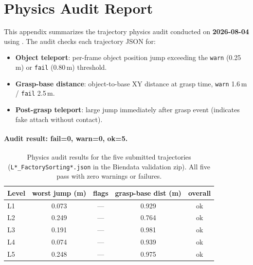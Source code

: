 \appendix
\section{Physics Audit Report}
\label{app:physics_audit}

This appendix summarizes the trajectory physics audit conducted on
\textbf{2026-08-04} using .
The audit checks each trajectory JSON for:
\begin{itemize}[leftmargin=*,itemsep=2pt]
    \item \textbf{Object teleport}: per-frame object position jump exceeding
    the \texttt{warn} (0.25\,m) or \texttt{fail} (0.80\,m) threshold.
    \item \textbf{Grasp-base distance}: object-to-base XY distance at grasp
    time, \texttt{warn} 1.6\,m / \texttt{fail} 2.5\,m.
    \item \textbf{Post-grasp teleport}: large jump immediately after grasp
    event (indicates fake attach without contact).
\end{itemize}

\paragraph{Audit result: fail=0, warn=0, ok=5.}

\begin{table}[h]
\centering
\small
\begin{tabular}{@{}lcccc@{}}
\toprule
Level & worst jump (m) & flags & grasp-base dist (m) & overall \\
\midrule
L1 & 0.073 & --- & 0.929 & ok \\
L2 & 0.249 & --- & 0.764 & ok \\
L3 & 0.191 & --- & 0.981 & ok \\
L4 & 0.074 & --- & 0.939 & ok \\
L5 & 0.248 & --- & 0.975 & ok \\
\bottomrule
\end{tabular}
\caption{Physics audit results for the five submitted trajectories
(\texttt{L*\_FactorySorting*.json} in the Biendata validation zip).
All five pass with zero warnings or failures.}
\label{tab:physics_audit}
\end{table}

